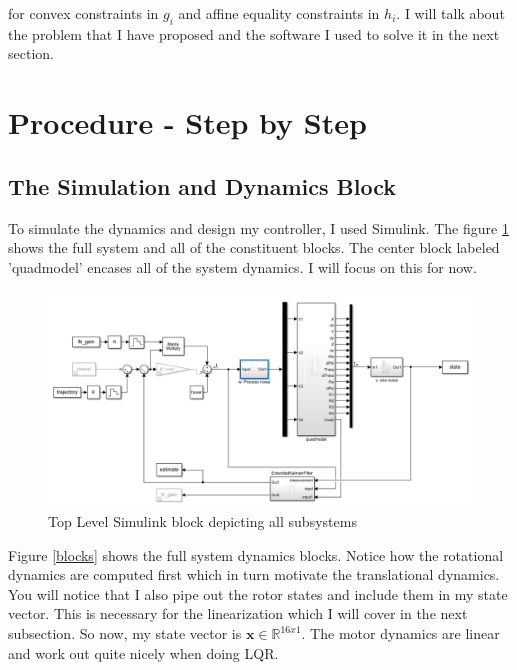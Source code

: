 \documentclass[conf]{new-aiaa}
\begin{document}
\begin{doublespace}
for convex constraints in $g_i$ and affine equality constraints in $h_i$. I will talk about the problem that I have proposed and the software I used to solve it in the next section.








\section{Procedure - Step by Step}
\subsection{The Simulation and Dynamics Block}
To simulate the dynamics and design my controller, I used Simulink. The figure \ref{block} shows the full system and all of the constituent blocks. The center block labeled 'quadmodel' encases all of the system dynamics. I will focus on this for now.

\begin{figure}[!h]
\centering
\includegraphics[scale= 0.45]{block.png}
\caption{Top Level Simulink block depicting all subsystems}
\label{block}
\end{figure}

Figure \ref{blocks} shows the full system dynamics blocks. Notice how the rotational dynamics are computed first which in turn motivate the translational dynamics. You will  notice that I also pipe out the rotor states and include them in my state vector. This is necessary for the linearization which I will cover in the next subsection. So now, my state vector is $\mathbf{x} \in \mathbb{R}^{16x1}$. The motor dynamics are linear and work out quite nicely when doing LQR.



\end{doublespace}
\end{document}
